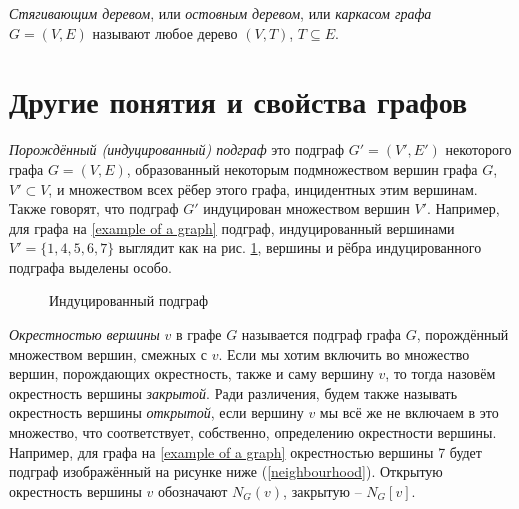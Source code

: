 \emph{Стягивающим деревом}, или \emph{остовным деревом}, или \emph{каркасом 
графа} $G=(V,E)$ называют любое дерево $(V,T)$, $T \subseteq E$.

\section{Другие понятия и свойства графов}

\emph{Порождённый (индуцированный) подграф} это подграф $G' = (V', E')$ некоторого графа $G = (V, E)$, образованный некоторым подмножеством вершин графа $G$, $V' \subset V$, и множеством всех рёбер этого графа, инцидентных этим вершинам. Также говорят, что подграф $G'$ индуцирован множеством вершин $V'$. Например, для графа на \ref{example of a graph} подграф, индуцированный вершинами $V' = \{1,4,5,6,7\}$ выглядит как на рис. \ref{induced subgraph}, вершины и рёбра индуцированного подграфа выделены особо.

\begin{figure}[h]
	\center
	\caption{Индуцированный подграф}
	\label{induced subgraph}
\end{figure}

\emph{Окрестностью вершины} $v$ в графе $G$ называется подграф графа $G$, порождённый множеством вершин, смежных с $v$. Если мы хотим включить во множество вершин, порождающих окрестность, также и саму вершину $v$, то тогда назовём окрестность вершины \emph{закрытой}. Ради различения, будем также называть окрестность вершины \emph{открытой}, если вершину $v$ мы всё же не включаем в это множество, что соответствует, собственно, определению окрестности вершины. Например, для графа на \ref{example of a graph} окрестностью вершины 7 будет подграф изображённый на рисунке ниже (\ref{neighbourhood}). Открытую окрестность вершины $v$ обозначают $N_G(v)$, закрытую -- $N_G[v]$.

